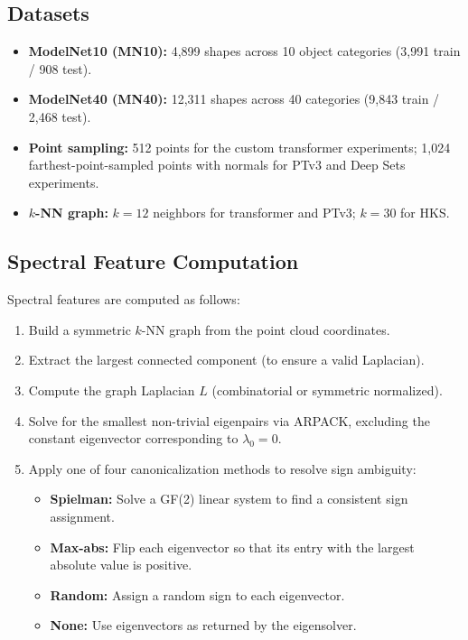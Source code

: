 \documentclass[11pt]{article}
\begin{document}
\subsection{Datasets}

\begin{itemize}[nosep]
    \item \textbf{ModelNet10 (MN10):} 4,899 shapes across 10 object categories (3,991 train / 908 test).
    \item \textbf{ModelNet40 (MN40):} 12,311 shapes across 40 categories (9,843 train / 2,468 test).
    \item \textbf{Point sampling:} 512 points for the custom transformer experiments; 1,024
          farthest-point-sampled points with normals for PTv3 and Deep Sets experiments.
    \item \textbf{$k$-NN graph:} $k = 12$ neighbors for transformer and PTv3; $k = 30$ for HKS.
\end{itemize}

\subsection{Spectral Feature Computation}

Spectral features are computed as follows:
\begin{enumerate}[nosep]
    \item Build a symmetric $k$-NN graph from the point cloud coordinates.
    \item Extract the largest connected component (to ensure a valid Laplacian).
    \item Compute the graph Laplacian $L$ (combinatorial or symmetric normalized).
    \item Solve for the smallest non-trivial eigenpairs via ARPACK, excluding the constant
          eigenvector corresponding to $\lambda_0 = 0$.
    \item Apply one of four canonicalization methods to resolve sign ambiguity:
          \begin{itemize}[nosep]
              \item \textbf{Spielman:} Solve a GF(2) linear system to find a consistent sign
                    assignment.
              \item \textbf{Max-abs:} Flip each eigenvector so that its entry with the largest
                    absolute value is positive.
              \item \textbf{Random:} Assign a random sign to each eigenvector.
              \item \textbf{None:} Use eigenvectors as returned by the eigensolver.
          \end{itemize}
\end{enumerate}
\end{document}
